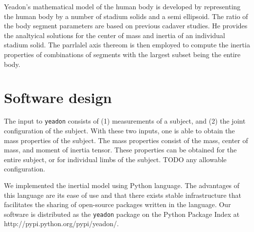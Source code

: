 \documentclass[10pt]{article}
\begin{document}

Yeadon's mathematical model of the human body is developed by representing the
human body by a number of stadium solids and a semi ellipsoid. The ratio of the
body segment parameters are based on previous cadaver studies. He provides the
analtyical solutions for the center of mass and inertia of an individual
stadium solid. The parrlalel axis thereom is then employed to compute the
inertia properties of combinations of segments with the largest subset being
the entire body.

\section*{Software design}

The input to \verb+yeadon+ consists of (1) measurements of a subject, and (2)
the joint configuration of the subject. With these two inputs, one is able to
obtain the mass properties of the subject.  The mass properties consist of the
mass, center of mass, and moment of inertia tensor. These properties can be
obtained for the entire subject, or for individual limbs of the subject. TODO
any allowable configuration.

We implemented the inertial model using Python language. The advantages of this
language
are its ease of use and that there exists stable infrastructure that
facilitates the sharing of open-source packages written in the language. Our
software is distributed as the \verb+yeadon+ package on the Python Package
Index at http://pypi.python.org/pypi/yeadon/.
\end{document}
